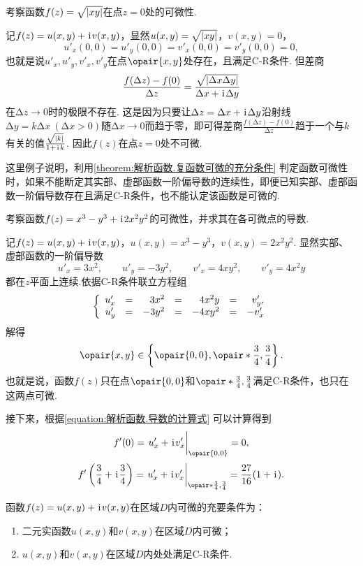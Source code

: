 \begin{example}
考察函数\(f(z) = \sqrt{\abs{xy}}\)在点\(z = 0\)处的可微性.
\begin{solution}
记\(f(z) = u(x,y) + \kern1pt\mathrm{i}\kern1pt v(x,y)\)，显然\(u(x,y) = \sqrt{\abs{xy}}\)，\(v(x,y) = 0\)，\[
u'_x(0,0) = u'_y(0,0) = v'_x(0,0) = v'_y(0,0) = 0,
\]也就是说\(u'_x,u'_y,v'_x,v'_y\)在点\(\opair{x,y}\)处存在，且满足C-R条件.
但差商\[
\frac{f(\Delta z) - f(0)}{\Delta z}
= \frac{ \sqrt{ \abs{ \Delta x \Delta y } } }{ \Delta x + \kern1pt\mathrm{i}\kern1pt \Delta y }
\]在\(\increment z \to 0\)时的极限不存在.
这是因为只要让\(\Delta z = \Delta x + \kern1pt\mathrm{i}\kern1pt \Delta y\)沿射线\(\increment y = k \increment x \ (\increment x > 0)\)随\(\increment x \to 0\)而趋于零，即可得差商\(\frac{f(\increment z) - f(0)}{\increment z}\)趋于一个与\(k\)有关的值\(\frac{\sqrt{\abs{k}}}{1 + \kern1pt\mathrm{i}\kern1pt k}\).
因此\(f(z)\)在点\(z = 0\)处不可微.
\end{solution}
这里例子说明，利用\cref{theorem:解析函数.复函数可微的充分条件} 判定函数可微性时，如果不能断定其实部、虚部函数一阶偏导数的连续性，即便已知实部、虚部函数一阶偏导数存在且满足C-R条件，也不能认定该函数是可微的.
\end{example}

\begin{example}
考察函数\(f(z) = x^3 - y^3 + \kern1pt\mathrm{i}\kern1pt 2 x^2 y^2\)的可微性，并求其在各可微点的导数.
\begin{solution}
记\(f(z) = u(x,y) + \kern1pt\mathrm{i}\kern1pt v(x,y)\)，\(u(x,y) = x^3 - y^3\)，\(v(x,y) = 2 x^2 y^2\).
显然实部、虚部函数的一阶偏导数\[
u'_x = 3x^2,
\qquad
u'_y = -3y^2,
\qquad
v'_x = 4xy^2,
\qquad
v'_y = 4x^2y
\]都在\(z\)平面上连续.依据C-R条件联立方程组\[
\left\{ \begin{array}{*7r}
u'_x &=& 3x^2 &=& 4x^2y &=& v'_y, \\
u'_y &=& -3y^2 &=& -4xy^2 &=& -v'_x
\end{array} \right.
\]解得\[
\opair{x,y}\in\left\{ \opair{0,0}, \opair*{\frac{3}{4},\frac{3}{4}} \right\}.
\]也就是说，函数\(f(z)\)只在点\(\opair{0,0}\)和\(\opair*{\frac{3}{4},\frac{3}{4}}\)满足C-R条件，也只在这两点可微.

接下来，根据\cref{equation:解析函数.导数的计算式} 可以计算得到\[
f'(0) = \eval{u'_x + \iu v'_x}_{\opair{0,0}} = 0,
\]\[
f'\left(\frac{3}{4}+\iu\frac{3}{4}\right)
= \eval{u'_x + \iu v'_x}_{\opair*{\frac{3}{4},\frac{3}{4}}}
= \frac{27}{16} (1+\iu).
\]
\end{solution}
\end{example}

\begin{theorem}\label{theorem:解析函数.函数在区域内处处可微的条件}
函数\(f(z)=u(x,y)+\kern1pt\mathrm{i}\kern1pt v(x,y)\)在区域\(D\)内可微的充要条件为：
\begin{enumerate}
\item 二元实函数\(u(x,y)\)和\(v(x,y)\)在区域\(D\)内可微；
\item \(u(x,y)\)和\(v(x,y)\)在区域\(D\)内处处满足C-R条件.
\end{enumerate}
\end{theorem}

